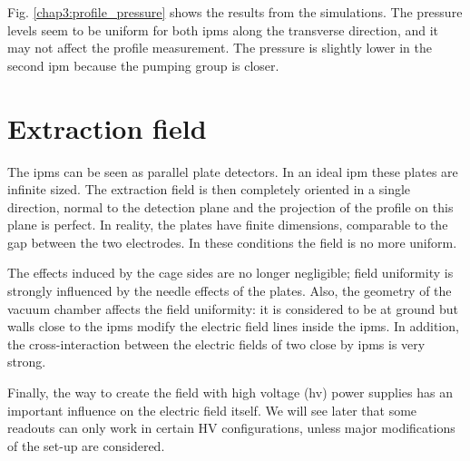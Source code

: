 \begin{refsection}
  Fig. \ref{chap3:profile_pressure} shows the results from the simulations. The pressure levels seem to be uniform for both \acrshort{ipm}s along the transverse direction, and it may not affect the profile measurement. The pressure is slightly lower in the second \acrshort{ipm} because the pumping group is closer.

  \section{Extraction field}
  
  The \acrshort{ipm}s can be seen as parallel plate detectors. In an ideal \acrshort{ipm} these plates are infinite sized. The extraction field is then completely oriented in a single direction, normal to the detection plane and the projection of the profile on this plane is perfect. In reality, the plates have finite dimensions, comparable to the gap between the two electrodes. In these conditions the field is no more uniform.

  The effects induced by the cage sides are no longer negligible; field uniformity is strongly influenced by the needle effects of the plates.
  Also, the geometry of the vacuum chamber affects the field uniformity: it is considered to be at ground but walls close to the \acrshort{ipm}s modify the electric field lines inside the \acrshort{ipm}s. In addition, the cross-interaction between the electric fields of two close by \acrshort{ipm}s is very strong.

  Finally, the way to create the field with high voltage (\acrshort{hv}) power supplies has an important influence on the electric field itself. We will see later that some readouts can only work in certain HV configurations, unless major modifications of the set-up are considered.


\end{refsection}
